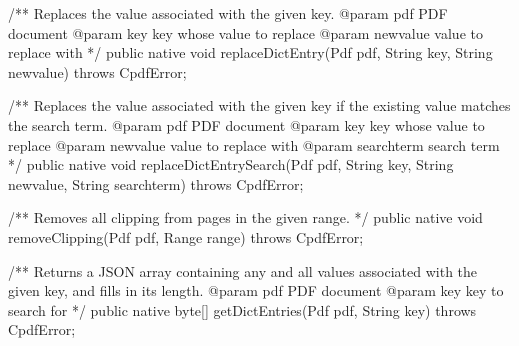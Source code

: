 /** Replaces the value associated with the given key.
@param pdf PDF document
@param key key whose value to replace
@param newvalue value to replace with */
public native void replaceDictEntry(Pdf pdf, String key, String newvalue)
    throws CpdfError;

/** Replaces the value associated with the given key if the existing value
matches the search term.
@param pdf PDF document
@param key key whose value to replace
@param newvalue value to replace with
@param searchterm search term */
public native void replaceDictEntrySearch(Pdf pdf, String key,
                                          String newvalue,
                                          String searchterm)
    throws CpdfError;

/** Removes all clipping from pages in the given range. */
public native void removeClipping(Pdf pdf, Range range) throws CpdfError;

/** Returns a JSON array containing any and all values associated with
the given key, and fills in its length.
@param pdf PDF document
@param key key to search for */
public native byte[] getDictEntries(Pdf pdf, String key) throws CpdfError;
